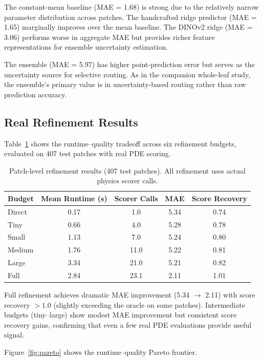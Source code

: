 \documentclass[11pt,a4paper]{article}
\begin{document}
The constant-mean baseline (MAE = 1.68) is strong due to the relatively
narrow parameter distribution across patches. The handcrafted ridge
predictor (MAE = 1.65) marginally improves over the mean baseline.
The DINOv2 ridge (MAE = 3.06) performs worse in aggregate MAE
but provides richer feature representations for ensemble uncertainty estimation.

The ensemble (MAE = 5.97) has higher point-prediction error but serves
as the uncertainty source for selective routing. As in the companion
whole-leaf study, the ensemble's primary value is in uncertainty-based routing
rather than raw prediction accuracy.

\subsection{Real Refinement Results}

Table~\ref{tab:refinement} shows the runtime--quality tradeoff across
six refinement budgets, evaluated on 407 test patches with real PDE scoring.

\begin{table}[h]
\centering
\caption{Patch-level refinement results (407 test patches).
All refinement uses actual physics scorer calls.}
\label{tab:refinement}
\begin{tabular}{lcccc}
\toprule
Budget & Mean Runtime (s) & Scorer Calls & MAE & Score Recovery \\
\midrule
Direct   & 0.17 & 1.0  & 5.34 & 0.74 \\
Tiny     & 0.66 & 4.0  & 5.28 & 0.78 \\
Small    & 1.13 & 7.0  & 5.24 & 0.80 \\
Medium   & 1.76 & 11.0 & 5.22 & 0.81 \\
Large    & 3.34 & 21.0 & 5.21 & 0.82 \\
Full     & 2.84 & 23.1 & 2.11 & 1.01 \\
\bottomrule
\end{tabular}
\end{table}

Full refinement achieves dramatic MAE improvement (5.34 $\to$ 2.11) with
score recovery $>1.0$ (slightly exceeding the oracle on some patches).
Intermediate budgets (tiny--large) show modest MAE improvement but
consistent score recovery gains, confirming that even a few real PDE
evaluations provide useful signal.

Figure~\ref{fig:pareto} shows the runtime--quality Pareto frontier.
\end{document}

